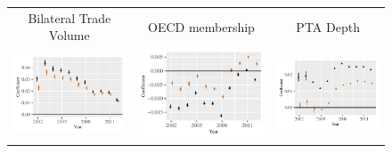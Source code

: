 \documentclass[reqno,onecolumn,letterpaper,12pt]{article}
\begin{document}
\begin{figure}[htp]
\begin{tabular}{@{\hskip -.05cm}c@{\hskip -.2cm}c@{\hskip -.2cm}c}
Bilateral Trade Volume&
OECD membership &
PTA Depth \\


\includegraphics[height=.165\textheight, clip=true, trim=.5cm .5cm 0cm .1cm]{figures/main_rl_plots/Trade_Volume.pdf} &
\includegraphics[height=.165\textheight, clip=true, trim=.5cm .5cm 0cm .1cm]{figures/main_rl_plots/Nodematch_OECD.pdf}    &
\includegraphics[height=.165\textheight, clip=true, trim=.5cm .5cm 0cm .1cm]{figures/main_rl_plots/PTA_Depth.pdf}    \\


\end{tabular}
\end{figure}
\end{document}
